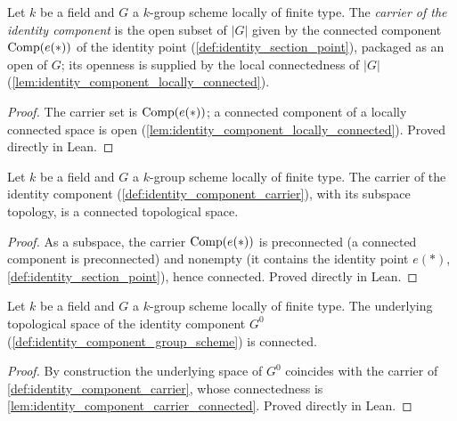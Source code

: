 \begin{definition}

  \label{def:identity_component_carrier}
  Let \(k\) be a field and \(G\) a \(k\)-group scheme locally of finite
  type. The \emph{carrier of the identity component} is the open subset of
  \(|G|\) given by the connected component
  \(\operatorname{Comp}(e(\ast))\) of the identity point
  (\cref{def:identity_section_point}), packaged as an open of \(G\); its
  openness is supplied by the local connectedness of \(|G|\)
  (\cref{lem:identity_component_locally_connected}).
\end{definition}
\begin{proof}
  The carrier set is \(\operatorname{Comp}(e(\ast))\); a connected component of a
  locally connected space is open
  (\cref{lem:identity_component_locally_connected}). Proved directly in
  Lean.
\end{proof}

\begin{lemma}

  \label{lem:identity_component_carrier_connected}
  Let \(k\) be a field and \(G\) a \(k\)-group scheme locally of finite
  type. The carrier of the identity component
  (\cref{def:identity_component_carrier}), with its subspace topology, is a
  connected topological space.
\end{lemma}
\begin{proof}
  As a subspace, the carrier \(\operatorname{Comp}(e(\ast))\) is preconnected (a
  connected component is preconnected) and nonempty (it contains the
  identity point \(e(\ast)\), \cref{def:identity_section_point}), hence
  connected. Proved directly in Lean.
\end{proof}

\begin{lemma}

  \label{lem:identity_component_connected}
  Let \(k\) be a field and \(G\) a \(k\)-group scheme locally of finite
  type. The underlying topological space of the identity component
  \(G^0\) (\cref{def:identity_component_group_scheme}) is connected.
\end{lemma}
\begin{proof}
  By construction the underlying space of \(G^0\) coincides with the
  carrier of \cref{def:identity_component_carrier}, whose connectedness is
  \cref{lem:identity_component_carrier_connected}. Proved directly in
  Lean.
\end{proof}

